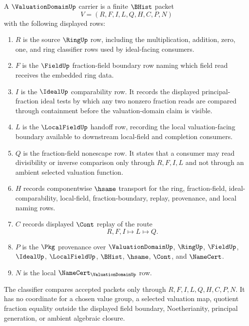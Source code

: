 \begin{definition}
\label{def:valuation-domain-carrier}
A $\ValuationDomainUp$ carrier is a finite $\BHist$ packet
$$
V=(R,F,I,L,Q,H,C,P,N)
$$
with the following displayed rows:
\begin{enumerate}
\item $R$ is the source $\RingUp$ row, including the multiplication, addition, zero, one, and ring classifier rows used by ideal-facing consumers.
\item $F$ is the $\FieldUp$ fraction-field boundary row naming which field read receives the embedded ring data.
\item $I$ is the $\IdealUp$ comparability row. It records the displayed principal-fraction ideal tests by which any two nonzero fraction reads are compared through containment before the valuation-domain claim is visible.
\item $L$ is the $\LocalFieldUp$ handoff row, recording the local valuation-facing boundary available to downstream local-field and completion consumers.
\item $Q$ is the fraction-field nonescape row. It states that a consumer may read divisibility or inverse comparison only through $R,F,I,L$ and not through an ambient selected valuation function.
\item $H$ records componentwise $\hsame$ transport for the ring, fraction-field, ideal-comparability, local-field, fraction-boundary, replay, provenance, and local naming rows.
\item $C$ records displayed $\Cont$ replay of the route
$$
R,F,I \longmapsto L \longmapsto Q .
$$
\item $P$ is the $\Pkg$ provenance over $\ValuationDomainUp$, $\RingUp$, $\FieldUp$, $\IdealUp$, $\LocalFieldUp$, $\BHist$, $\hsame$, $\Cont$, and $\NameCert$.
\item $N$ is the local $\NameCert_{\ValuationDomainUp}$ row.
\end{enumerate}
The classifier compares accepted packets only through $R,F,I,L,Q,H,C,P,N$. It has no coordinate for a chosen value group, a selected valuation map, quotient fraction equality outside the displayed field boundary, Noetherianity, principal generation, or ambient algebraic closure.
\end{definition}


